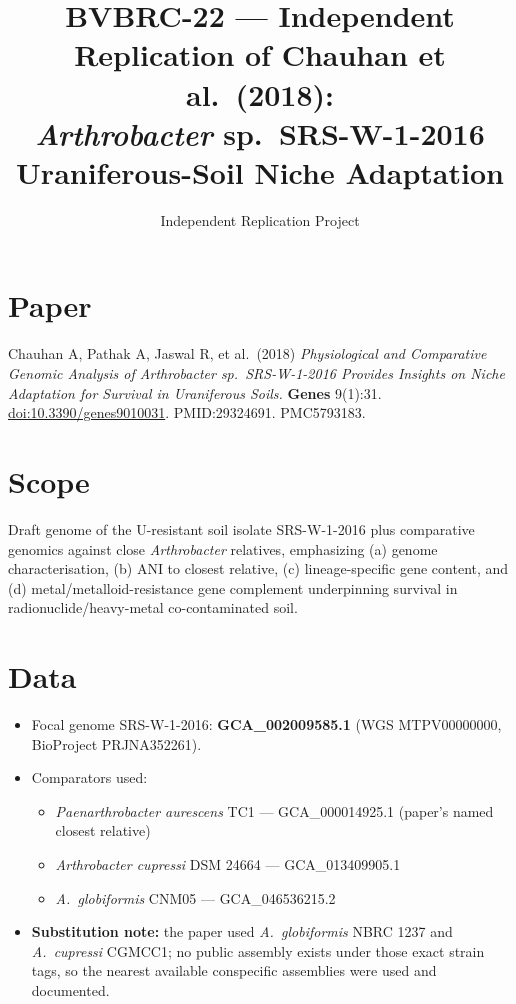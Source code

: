 \documentclass[11pt]{article}
\title{BVBRC-22 --- Independent Replication of Chauhan et al.\ (2018):\\
\textit{Arthrobacter} sp.\ SRS-W-1-2016 Uraniferous-Soil Niche Adaptation}
\author{Independent Replication Project}
\date{}
\begin{document}
\maketitle

\begin{center}
\end{center}

\section{Paper}
Chauhan A, Pathak A, Jaswal R, et al.\ (2018) \textit{Physiological and Comparative Genomic Analysis of Arthrobacter sp.\ SRS-W-1-2016 Provides Insights on Niche Adaptation for Survival in Uraniferous Soils.} \textbf{Genes} 9(1):31. \href{https://doi.org/10.3390/genes9010031}{doi:10.3390/genes9010031}. PMID:29324691. PMC5793183.

\section{Scope}
Draft genome of the U-resistant soil isolate SRS-W-1-2016 plus comparative genomics against close \textit{Arthrobacter} relatives, emphasizing (a) genome characterisation, (b) ANI to closest relative, (c) lineage-specific gene content, and (d) metal/metalloid-resistance gene complement underpinning survival in radionuclide/heavy-metal co-contaminated soil.

\section{Data}
\begin{itemize}
  \item Focal genome SRS-W-1-2016: \textbf{GCA\_002009585.1} (WGS MTPV00000000, BioProject PRJNA352261).
  \item Comparators used:
  \begin{itemize}
    \item \textit{Paenarthrobacter aurescens} TC1 --- GCA\_000014925.1 (paper's named closest relative)
    \item \textit{Arthrobacter cupressi} DSM 24664 --- GCA\_013409905.1
    \item \textit{A.\ globiformis} CNM05 --- GCA\_046536215.2
  \end{itemize}
  \item \textbf{Substitution note:} the paper used \textit{A.\ globiformis} NBRC 1237 and \textit{A.\ cupressi} CGMCC1; no public assembly exists under those exact strain tags, so the nearest available conspecific assemblies were used and documented.
\end{itemize}
\end{document}
